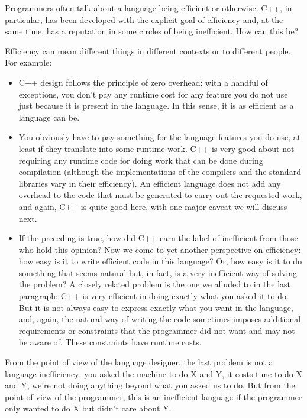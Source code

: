 Programmers often talk about a language being efficient or otherwise. C++, in particular, has been developed with the explicit goal of efficiency and, at the same time, has a reputation in some circles of being inefficient. How can this be?

Efficiency can mean different things in different contexts or to different people. For example:

\begin{itemize}
\item
C++ design follows the principle of zero overhead: with a handful of exceptions, you don’t pay any runtime cost for any feature you do not use just because it is present in the language. In this sense, it is as efficient as a language can be.

\item
You obviously have to pay something for the language features you do use, at least if they translate into some runtime work. C++ is very good about not requiring any runtime code for doing work that can be done during compilation (although the implementations of the compilers and the standard libraries vary in their efficiency). An efficient language does not add any overhead to the code that must be generated to carry out the requested work, and again, C++ is quite good here, with one major caveat we will discuss next.

\item
If the preceding is true, how did C++ earn the label of inefficient from those who hold this opinion? Now we come to yet another perspective on efficiency: how easy is it to write efficient code in this language? Or, how easy is it to do something that seems natural but, in fact, is a very inefficient way of solving the problem? A closely related problem is the one we alluded to in the last paragraph: C++ is very efficient in doing exactly what you asked it to do. But it is not always easy to express exactly what you want in the language, and, again, the natural way of writing the code sometimes imposes additional requirements or constraints that the programmer did not want and may not be aware of. These constraints have runtime costs.
	
\end{itemize}

From the point of view of the language designer, the last problem is not a language inefficiency: you asked the machine to do X and Y, it costs time to do X and Y, we’re not doing anything beyond what you asked us to do. But from the point of view of the programmer, this is an inefficient language if the programmer only wanted to do X but didn’t care about Y. 

